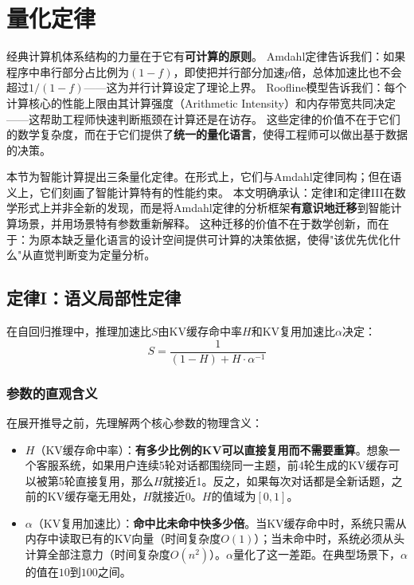 \section{量化定律}
\label{sec:laws}

经典计算机体系结构的力量在于它有\textbf{可计算的原则}。
Amdahl定律告诉我们：如果程序中串行部分占比例为$(1-f)$，即使把并行部分加速$p$倍，总体加速比也不会超过$1/(1-f)$——这为并行计算设定了理论上界\cite{hennessy2017quantitative}。
Roofline模型告诉我们：每个计算核心的性能上限由其计算强度（Arithmetic Intensity）和内存带宽共同决定——这帮助工程师快速判断瓶颈在计算还是在访存\cite{hennessy2017quantitative}。
这些定律的价值不在于它们的数学复杂度，而在于它们提供了\textbf{统一的量化语言}，使得工程师可以做出基于数据的决策。

本节为智能计算提出三条量化定律。在形式上，它们与Amdahl定律同构；但在语义上，它们刻画了智能计算特有的性能约束。
本文明确承认：定律I和定律III在数学形式上并非全新的发现，而是将Amdahl定律的分析框架\textbf{有意识地迁移}到智能计算场景，并用场景特有参数重新解释。
这种迁移的价值不在于数学创新，而在于：为原本缺乏量化语言的设计空间提供可计算的决策依据，使得"该优先优化什么"从直觉判断变为定量分析。

\subsection{定律I：语义局部性定律}
\label{sec:law1}

\begin{law}[语义局部性定律]
在自回归推理中，推理加速比$S$由KV缓存命中率$H$和KV复用加速比$\alpha$决定：
\begin{equation}
\label{eq:locality}
S = \frac{1}{(1-H) + H \cdot \alpha^{-1}}
\end{equation}
\end{law}

\subsubsection{参数的直观含义}

在展开推导之前，先理解两个核心参数的物理含义：

\begin{itemize}[nosep]
\item $H$（KV缓存命中率）：\textbf{有多少比例的KV可以直接复用而不需要重算}。想象一个客服系统，如果用户连续5轮对话都围绕同一主题，前4轮生成的KV缓存可以被第5轮直接复用，那么$H$就接近1。反之，如果每次对话都是全新话题，之前的KV缓存毫无用处，$H$就接近0。$H$的值域为$[0, 1]$。
\item $\alpha$（KV复用加速比）：\textbf{命中比未命中快多少倍}。当KV缓存命中时，系统只需从内存中读取已有的KV向量（时间复杂度$O(1)$）；当未命中时，系统必须从头计算全部注意力（时间复杂度$O(n^2)$）。$\alpha$量化了这一差距。在典型场景下，$\alpha$的值在$10$到$100$之间。
\end{itemize}

